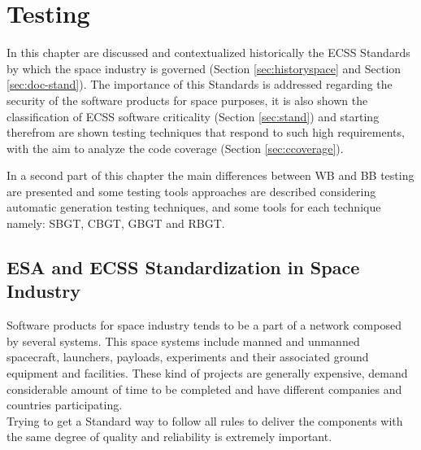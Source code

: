 \chapter{Testing}
\minitoc
In this chapter are discussed and contextualized historically the \ac{ECSS} Standards by which the space industry is governed (Section \ref{sec:historyspace} and Section \ref{sec:doc-stand}).
The importance of this Standards is addressed regarding the security of the software products for space purposes, it is also
shown the classification of \ac{ECSS} software criticality (Section \ref{sec:stand}) and starting therefrom are shown testing techniques that 
respond to such high requirements, with the aim to analyze the code coverage (Section \ref{sec:ccoverage}).

In a second part of this chapter the main differences between \ac{WB} and \ac{BB} testing are presented and
some testing tools approaches are described considering automatic generation testing techniques, and some tools for each technique namely:
\ac{SBGT}, \ac{CBGT}, \ac{GBGT} and
\ac{RBGT}.
\section{ESA and ECSS Standardization in Space Industry}
Software products for space industry tends to be a part of a network composed by several systems. This space systems include manned and unmanned spacecraft,
launchers, payloads, experiments and their associated ground equipment and facilities\cite{Mattiello-FranciscoSanAmbJogCos:2007:BrSoIn}.
These kind of projects are generally  expensive, demand considerable amount of time to be completed and have different companies and countries participating.\\
Trying to get a Standard way to follow all rules to deliver the components with the same degree of quality and reliability is extremely important.\\


